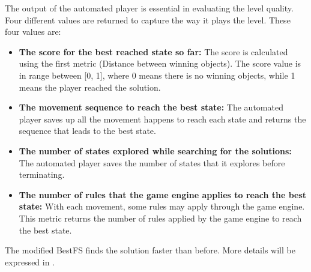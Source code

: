 The output of the automated player is essential in evaluating the level quality. Four different values are returned to capture the way it plays the level. These four values are:
\begin{itemize} \itemsep0pt \parskip0pt 
	\item \textbf{The score for the best reached state so far:} The score is calculated using the first metric (Distance between winning objects). The score value is in range between [0, 1], where 0 means there is no winning objects, while 1 means the player reached the solution.
	\item \textbf{The movement sequence to reach the best state:} The automated player saves up all the movement happens to reach each state and returns the sequence that leads to the best state.
	\item \textbf{The number of states explored while searching for the solutions:} The automated player saves the number of states that it explores before terminating.
	\item \textbf{The number of rules that the game engine applies to reach the best state:} With each movement, some rules may apply through the game engine. This metric returns the number of rules applied by the game engine to reach the best state.
\end{itemize}
The modified BestFS finds the solution faster than before. More details will be expressed in .\\\par

